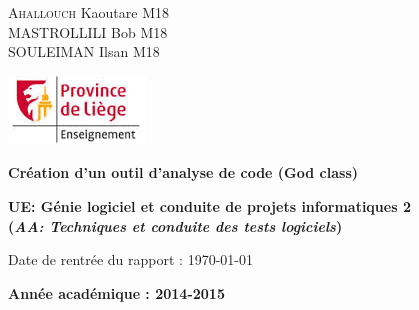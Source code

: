 \begin{titlepage}
\parindent=0pt
\begin{minipage}{0.4\textwidth}
	\begin{flushleft} \large
		\textsc{Ahallouch} Kaoutare M18\\[.2cm]
		\textsc{MASTROLLILI} Bob M18\\[.2cm]
		\textsc{SOULEIMAN} Ilsan M18\\[.2cm]
	\end{flushleft}
\end{minipage}
\begin{center}
\includegraphics[scale= 1]{images/logo.jpg}%
\end{center}
\hrulefill
\begin{center}\bfseries\Huge
    Création d’un outil d’analyse de code (God class) 
\end{center}
\hrulefill
\vspace*{1cm}
\begin{center}\bfseries\Large
	UE: Génie logiciel et conduite de projets informatiques  2\\
	(\textit{AA: Techniques et conduite des tests logiciels})
\end{center}
  
\begin{center}
       Date de rentrée du rapport : \today
\end{center}   

\begin{center}\bfseries\Large
Année académique : 2014-2015
\end{center}
\end{titlepage}